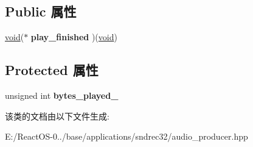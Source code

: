 \subsection*{Public 属性}
\begin{DoxyCompactItemize}
\item 
\mbox{\label{classaudio__producer_a67040bf2e5be7b16eb66a5bdc6d0eb36}} 
\hyperlink{interfacevoid}{void}($\ast$ {\bfseries play\+\_\+finished} )(\hyperlink{interfacevoid}{void})
\end{DoxyCompactItemize}
\subsection*{Protected 属性}
\begin{DoxyCompactItemize}
\item 
\mbox{\label{classaudio__producer_a42cadbab3acd7b376a7aef45aaab53cb}} 
unsigned int {\bfseries bytes\+\_\+played\+\_\+}
\end{DoxyCompactItemize}


该类的文档由以下文件生成\+:\begin{DoxyCompactItemize}
\item 
E\+:/\+React\+O\+S-\/0../base/applications/sndrec32/audio\+\_\+producer.\+hpp\end{DoxyCompactItemize}
